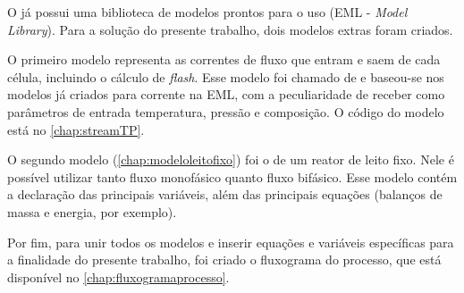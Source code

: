 O \emso{} já possui uma biblioteca de modelos prontos para o uso (EML -
\emph{\emso{} Model Library}). Para a solução do presente trabalho, dois modelos
extras foram criados.

O primeiro modelo representa as correntes de fluxo que entram e saem de
cada célula, incluindo o cálculo de \emph{flash}. Esse modelo foi chamado de
 e baseou-se nos modelos já criados para corrente na EML, com
a peculiaridade de receber como parâmetros de entrada temperatura, pressão e
composição. O código do modelo  está no
\autoref{chap:streamTP}.

O segundo modelo (\autoref{chap:modeloleitofixo}) foi o de um reator de leito
fixo. Nele é possível utilizar tanto fluxo monofásico quanto fluxo bifásico.
Esse modelo contém a declaração das principais variáveis, além das principais
equações (balanços de massa e energia, por exemplo).

Por fim, para unir todos os modelos e inserir equações e variáveis
específicas para a finalidade do presente trabalho, foi criado o fluxograma do
processo, que está disponível no \autoref{chap:fluxogramaprocesso}.


